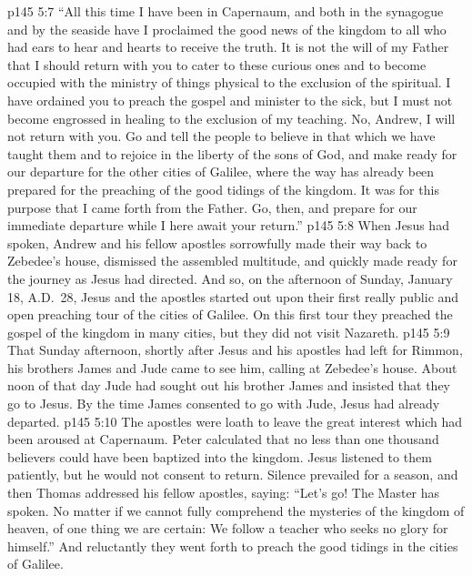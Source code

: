 \vs p145 5:7 \textcolor{ubdarkred}{“All this time I have been in Capernaum, and both in the synagogue and by the seaside have I proclaimed the good news of the kingdom to all who had ears to hear and hearts to receive the truth. It is not the will of my Father that I should return with you to cater to these curious ones and to become occupied with the ministry of things physical to the exclusion of the spiritual. I have ordained you to preach the gospel and minister to the sick, but I must not become engrossed in healing to the exclusion of my teaching. No, Andrew, I will not return with you. Go and tell the people to believe in that which we have taught them and to rejoice in the liberty of the sons of God, and make ready for our departure for the other cities of Galilee, where the way has already been prepared for the preaching of the good tidings of the kingdom. It was for this purpose that I came forth from the Father. Go, then, and prepare for our immediate departure while I here await your return.”}
\vs p145 5:8 When Jesus had spoken, Andrew and his fellow apostles sorrowfully made their way back to Zebedee’s house, dismissed the assembled multitude, and quickly made ready for the journey as Jesus had directed. And so, on the afternoon of Sunday, January 18, A.D.~28, Jesus and the apostles started out upon their first really public and open preaching tour of the cities of Galilee. On this first tour they preached the gospel of the kingdom in many cities, but they did not visit Nazareth.
\vs p145 5:9 That Sunday afternoon, shortly after Jesus and his apostles had left for Rimmon, his brothers James and Jude came to see him, calling at Zebedee’s house. About noon of that day Jude had sought out his brother James and insisted that they go to Jesus. By the time James consented to go with Jude, Jesus had already departed.
\vs p145 5:10 The apostles were loath to leave the great interest which had been aroused at Capernaum. Peter calculated that no less than one thousand believers could have been baptized into the kingdom. Jesus listened to them patiently, but he would not consent to return. Silence prevailed for a season, and then Thomas addressed his fellow apostles, saying: “Let’s go! The Master has spoken. No matter if we cannot fully comprehend the mysteries of the kingdom of heaven, of one thing we are certain: We follow a teacher who seeks no glory for himself.” And reluctantly they went forth to preach the good tidings in the cities of Galilee.
